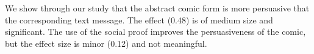 We show through our study that the abstract comic form is more persuasive that the corresponding text message. The effect (0.48) is of medium size and significant. The use of the social proof improves the persuasiveness of the comic, but the effect size is minor (0.12) and not meaningful.






